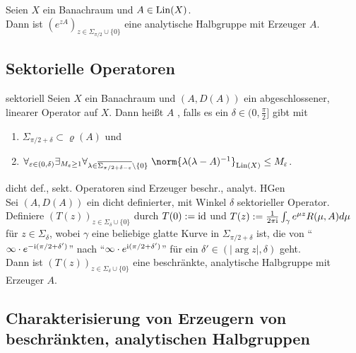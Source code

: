 \begin{Bsp}
    Seien $X$ ein Banachraum und $A \in \operatorname{Lin}(X)$.\\
    Dann ist $(e^{zA})_{z \in \Sigma_{\pi/2} \cup \{0\}}$ eine analytische Halbgruppe
    mit Erzeuger $A$.
\end{Bsp}

\subsection{%
    Sektorielle Operatoren%
}

\begin{Def}{sektoriell}
    Seien $X$ ein Banachraum und $(A, D(A))$ ein abgeschlossener, linearer Operator auf $X$.
    Dann heißt $A$ , falls
    es ein $\delta \in (0, \frac{\pi}{2}]$ gibt mit
    \begin{enumerate}
        \item
        $\Sigma_{\pi/2+\delta} \subset \varrho(A)$ und
        
        \item
        $\forall_{\varepsilon \in (0, \delta)} \exists_{M_\varepsilon \ge 1}
        \forall_{\lambda \in \overline{\Sigma_{\pi/2+\delta-\varepsilon}} \setminus \{0\}}\;
        \norm{\lambda (\lambda - A)^{-1}}_{\Lin(X)} \le M_\varepsilon$.
    \end{enumerate}
\end{Def}

\begin{Satz}{dicht def., sekt. Operatoren sind Erzeuger beschr., analyt. HGen}\\
    Sei $(A, D(A))$ ein dicht definierter, mit Winkel $\delta$ sektorieller Operator.\\
    Definiere $(T(z))_{z \in \Sigma_\delta \cup \{0\}}$ durch $T(0) := \text{id}$ und
    $T(z) := \frac{1}{2\pi\mathrm{i}} \int_\gamma e^{\mu z} R(\mu, A) d\mu$ für $z \in \Sigma_\delta$,
    wobei $\gamma$ eine beliebige glatte Kurve in $\Sigma_{\pi/2+\delta}$ ist,
    die von "`$\infty \cdot e^{-\mathrm{i}(\pi/2+\delta')}$"' nach
    "`$\infty \cdot e^{\mathrm{i}(\pi/2+\delta')}$"' für ein $\delta' \in (|\arg z|, \delta)$ geht.\\
    Dann ist $(T(z))_{z \in \Sigma_\delta \cup \{0\}}$ eine beschränkte, analytische Halbgruppe
    mit Erzeuger $A$.
\end{Satz}

\pagebreak

\subsection{%
    Charakterisierung von Erzeugern von beschränkten, analytischen Halbgruppen%
}


